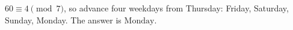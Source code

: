 $60\equiv4\pmod7$, so advance four weekdays from Thursday: Friday, Saturday, Sunday, Monday. The answer is $\boxed{\text{Monday}}$.
